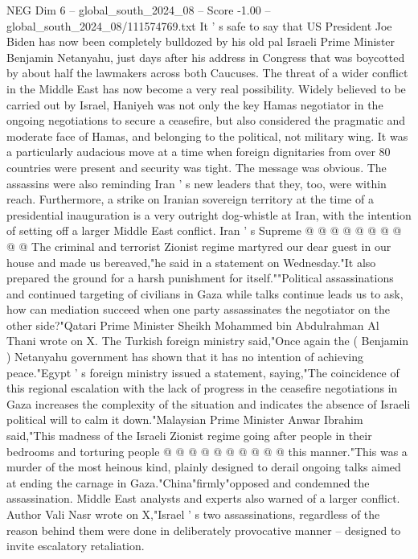 \begin{textsample}{NEG Dim 6 – global\_south\_2024\_08 – Score -1.00 – global\_south\_2024\_08/111574769.txt}  \label{ex:f6_neg_135}
It ' s safe to say that US President Joe Biden has now been completely bulldozed by his old pal Israeli Prime Minister Benjamin Netanyahu, just days after his address in Congress that was boycotted by about half the lawmakers across both Caucuses.
The threat of a wider conflict in the Middle East has now become a very real possibility.
Widely believed to be carried out by Israel, Haniyeh was not only the key Hamas negotiator in the ongoing negotiations to secure a ceasefire, but also considered the pragmatic and moderate face of Hamas, and belonging to the political, not military wing.
It was a particularly audacious move at a time when foreign dignitaries from over 80 countries were present and security was tight.
The message was obvious.
The assassins were also reminding Iran ' s new leaders that they, too, were within reach.
Furthermore, a strike on Iranian sovereign territory at the time of a presidential inauguration is a very outright dog-whistle at Iran, with the intention of setting off a larger Middle East conflict.
Iran ' s Supreme @ @ @ @ @ @ @ @ @ @ The criminal and terrorist Zionist regime martyred our dear guest in our house and made us bereaved,"he said in a statement on Wednesday."It also prepared the ground for a harsh punishment for itself.""Political assassinations and continued targeting of civilians in Gaza while talks continue leads us to ask, how can mediation succeed when one party assassinates the negotiator on the other side?"Qatari Prime Minister Sheikh Mohammed bin Abdulrahman Al Thani wrote on X.
The Turkish foreign ministry said,"Once again the ( Benjamin ) Netanyahu government has shown that it has no intention of achieving peace."Egypt ' s foreign ministry issued a statement, saying,"The coincidence of this regional escalation with the lack of progress in the ceasefire negotiations in Gaza increases the complexity of the situation and indicates the absence of Israeli political will to calm it down."Malaysian Prime Minister Anwar Ibrahim said,"This madness of the Israeli Zionist regime going after people in their bedrooms and torturing people @ @ @ @ @ @ @ @ @ @ this manner."This was a murder of the most heinous kind, plainly designed to derail ongoing talks aimed at ending the carnage in Gaza."China"firmly"opposed and condemned the assassination.
Middle East analysts and experts also warned of a larger conflict.
Author Vali Nasr wrote on X,"Israel ' s two assassinations, regardless of the reason behind them were done in deliberately provocative manner -- designed to invite escalatory retaliation.

\end{textsample}
